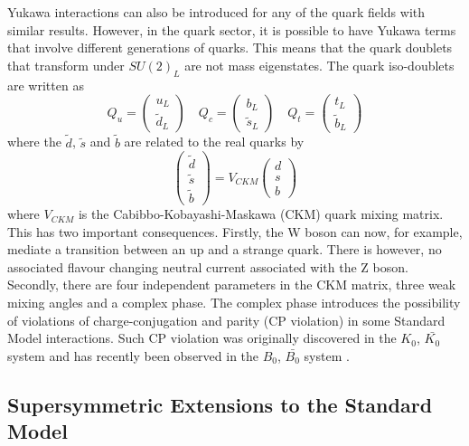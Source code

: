 Yukawa interactions can also be introduced for any of the quark fields with similar results. However, in the quark sector, it is possible to have Yukawa terms that involve different generations of quarks. This means that the quark doublets that transform under $SU(2)_L$ are not mass eigenstates. The quark iso-doublets are written as
\begin{equation}
Q_u = \left(
\begin{array}{c}
u_L \\ \tilde{d}_L
\end{array}
\right)
\quad
Q_c = \left(
\begin{array}{c}
b_L \\ \tilde{s}_L
\end{array}
\right)
\quad
Q_t = \left(
\begin{array}{c}
t_L \\ \tilde{b}_L
\end{array}
\right)
\end{equation}
where the $\tilde{d}$, $\tilde{s}$ and $\tilde{b}$ are related to the real quarks by
\begin{equation}
\left(
\begin{array}{c}
\tilde{d} \\ \tilde{s} \\ \tilde{b} 
\end{array}
\right)
=
V_{CKM}
\left(
\begin{array}{c}
d \\ s\\ b
\end{array}
\right)
\end{equation}
where $V_{CKM}$ is the Cabibbo-Kobayashi-Maskawa (CKM) quark mixing matrix. This has two important consequences. Firstly, the W boson can now, for example, mediate a transition between an up and a strange quark. There is however, no associated flavour changing neutral current associated with the Z boson. Secondly, there are four independent parameters in the CKM matrix, three weak mixing angles and a complex phase. The complex phase introduces the possibility of violations of charge-conjugation and parity (CP violation) in some Standard Model interactions. Such CP violation was originally discovered in the $K_0$, $\bar{K_0}$ system \cite{Christenson} and has recently been observed in the  %
$B_0$, $\bar{B_0}$ system \cite{Aubert:2004zt,Abe:2001xe}.



\subsection{Supersymmetric Extensions to the Standard Model} \label{susy}

